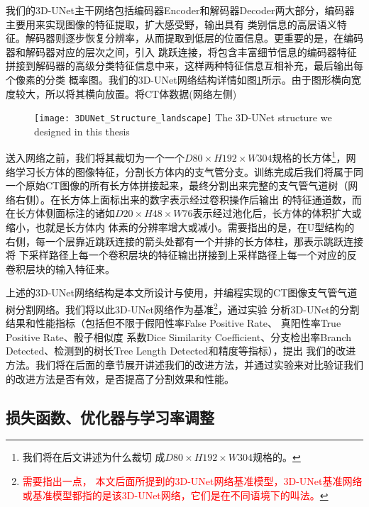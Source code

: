 我们的3D-UNet主干网络包括编码器Encoder和解码器Decoder两大部分，编码器主要用来实现图像的特征提取，扩大感受野，输出具有
类别信息的高层语义特征。解码器则逐步恢复分辨率，从而提取到低层的位置信息。更重要的是，在编码器和解码器对应的层次之间，引入
跳跃连接，将包含丰富细节信息的编码器特征拼接到解码器的高级分类特征信息中来，这样两种特征信息互相补充，最后输出每个像素的分类
概率图。我们的3D-UNet网络结构详情如图\ref{fig:3DUNetStructure}所示。由于图形横向宽度较大，所以将其横向放置。将CT体数据(网络左侧)
\begin{figure}[!ht]
    \centering
    \texttt{[image: 3DUNet\_Structure\_landscape]}
        {The 3D-UNet structure we designed in this thesis}
    \label{fig:3DUNetStructure}
\end{figure}
送入网络之前，我们将其裁切为一个一个$D80 \times H192 \times W304$规格的长方体\footnote{我们将在后文讲述为什么裁切
成$D80 \times H192 \times W304$规格的。}，网络学习长方体的图像特征，分割长方体内的支气管分支。训练完成后我们将属于同
一个原始CT图像的所有长方体拼接起来，最终分割出来完整的支气管气道树（网络右侧）。在长方体上面标出来的数字表示经过卷积操作后输出
的特征通道数，而在长方体侧面标注的诸如$D20 \times H48 \times W76$表示经过池化后，长方体的体积扩大或缩小，也就是长方体内
体素的分辨率增大或减小。需要指出的是，在U型结构的右侧，每一个层靠近跳跃连接的箭头处都有一个并排的长方体柱，那表示跳跃连接将
下采样路径上每一个卷积层块的特征输出拼接到上采样路径上每一个对应的反卷积层块的输入特征来。

上述的3D-UNet网络结构是本文所设计与使用，并编程实现的CT图像支气管气道树分割网络。我们将以此3D-UNet网络作为基准\footnote{\textcolor{red}{需要指出一点，
本文后面所提到的3D-UNet网络基准模型，3D-UNet基准网络或基准模型都指的是该3D-UNet网络，它们是在不同语境下的叫法。}}，通过实验
分析3D-UNet的分割结果和性能指标（包括但不限于假阳性率False Positive Rate、 真阳性率True Positive Rate、骰子相似度
系数Dice Similarity Coefficient、分支检出率Branch Detected、检测到的树长Tree Length Detected和精度等指标），提出
我们的改进方法。我们将在后面的章节展开讲述我们的改进方法，并通过实验来对比验证我们的改进方法是否有效，是否提高了分割效果和性能。

\subsection{损失函数、优化器与学习率调整}
